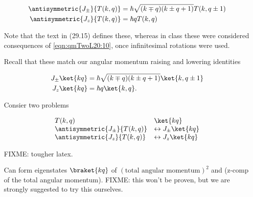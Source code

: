 \begin{align}\label{eqn:qmTwoL20:50}
\antisymmetric{J_{\pm}}{T(k, q)} &= \hbar \sqrt{(k \mp q)(k \pm q + 1)} T(k, q \pm 1) \\
\antisymmetric{J_{z}}{T(k, q)} &= \hbar q T(k, q)
\end{align}

Note that the text in (29.15) defines these, whereas in class these were considered consequences of \ref{eqn:qmTwoL20:10}, once infinitesimal rotations were used.

Recall that these match our angular momentum raising and lowering identities

\begin{align}\label{eqn:qmTwoL20:50}
J_{\pm} \ket{k q} &= \hbar \sqrt{(k \mp q)(k \pm q + 1)} \ket{k, q \pm 1} \\
J_{z} \ket{k q} &= \hbar q \ket{k, q}.
\end{align}

Consier two problems 

\begin{equation}\label{eqn:qmTwoL20:n}
\begin{array}{l l}
T(k, q)						& \ket{k q} \\
\antisymmetric{J_{\pm}}{T(k, q)} 		&\leftrightarrow J_{\pm} \ket{k q} \\
\antisymmetric{J_{z}}{T(k, q)} 			&\leftrightarrow J_{z} \ket{k q}
\end{array}
\end{equation}

FIXME: tougher latex.
%

Can form eigenstates $\braket{kq}$ of $(\text{total angular momentum})^2$ and (z-comp of the total angular momentum).  
FIXME: this won't be proven, but we are strongly suggested to try this ourselves.

